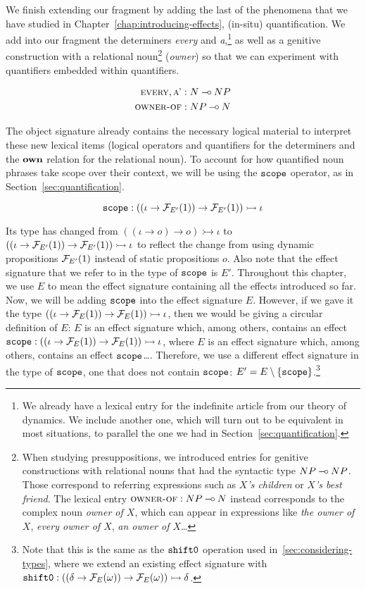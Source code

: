 We finish extending our fragment by adding the last of the phenomena that
we have studied in Chapter~\ref{chap:introducing-effects}, (in-situ)
quantification. We add into our fragment the determiners \emph{every} and
\emph{a},\footnote{We already have a lexical entry for the indefinite
  article from our theory of dynamics. We include another one, which will
  turn out to be equivalent in most situations, to parallel the one we had
  in Section~\ref{sec:quantification}.} as well as a genitive construction
with a relational noun\footnote{When studying presuppositions, we
  introduced entries for genitive constructions with relational nouns that
  had the syntactic type $NP \mathbin{{-}\mkern-3.5mu{\circ}} NP$. Those correspond to referring
  expressions such as \emph{$X$'s children} or \emph{$X$'s best
    friend}. The lexical entry $\textsc{owner-of} : NP \mathbin{{-}\mkern-3.5mu{\circ}} N$ instead
  corresponds to the complex noun \emph{owner of $X$}, which can appear in
  expressions like \emph{the owner of $X$}, \emph{every owner of $X$},
  \emph{an owner of $X$}\ldots} (\emph{owner}) so that we can experiment
with quantifiers embedded within quantifiers.

\begin{align*}
  \textsc{every}, \textsc{a'} &: N \mathbin{{-}\mkern-3.5mu{\circ}} NP \\
  \textsc{owner-of} &: NP \mathbin{{-}\mkern-3.5mu{\circ}} N
\end{align*}

The object signature already contains the necessary logical material to
interpret these new lexical items (logical operators and quantifiers for
the determiners and the $\textbf{own}$ relation for the relational noun). To
account for how quantified noun phrases take scope over their
context, we will be using the $\mathtt{scope}$ operator, as in
Section~\ref{sec:quantification}.

$$
\mathtt{scope} : ((\iota \to \mathcal{F}_{E'}(1)) \to \mathcal{F}_{E'}(1)) \rightarrowtail \iota
$$

Its type has changed from $((\iota \to o) \to o) \rightarrowtail \iota$ to
$((\iota \to \mathcal{F}_{E'}(1)) \to \mathcal{F}_{E'}(1)) \rightarrowtail \iota$ to
reflect the change from using dynamic propositions $\mathcal{F}_{E'}(1)$ instead of
static propositions $o$. Also note that the effect signature that we refer
to in the type of $\mathtt{scope}$ is $E'$. Throughout this chapter, we use $E$
to mean the effect signature containing all the effects introduced so
far. Now, we will be adding $\mathtt{scope}$ into the effect signature
$E$. However, if we gave it the type
$((\iota \to \mathcal{F}_E(1)) \to \mathcal{F}_E(1)) \rightarrowtail \iota$, then we would
be giving a circular definition of $E$: $E$ is an effect signature which,
among others, contains an effect
$\mathtt{scope} : ((\iota \to \mathcal{F}_E(1)) \to \mathcal{F}_E(1)) \rightarrowtail \iota$, where $E$ is
an effect signature which, among others, contains an effect
$\mathtt{scope}$\ldots. Therefore, we use a different effect signature in the
type of $\mathtt{scope}$, one that does not contain $\mathtt{scope}$:
$E' = E \setminus \{\mathtt{scope}\}$.\footnote{Note that this is the same as
  the $\mathtt{shift0}$ operation used in~\ref{sec:considering-types}, where we
  extend an existing effect signature with
  $\mathtt{shift0} : ((\delta \to \mathcal{F}_E(\omega)) \to
    \mathcal{F}_E(\omega)) \rightarrowtail \delta$.}

